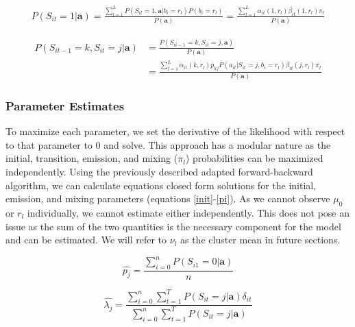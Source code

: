 \documentclass{article}
\begin{document}
\begin{equation}\label{probs1}
\begin{split}
    P(S_{it}=1|\textbf{a}) = 
    \frac{\sum^L_{l=1}P(S_{it}=1,\textbf{a}|b_{i}=r_l)
        P(b_{i}=r_l)}{P(\textbf{a})} = 
    \frac{\sum^L_{l=1}\alpha_{it}(1,r_l)\beta_{it}(1,r_l)\pi_l }{P(\textbf{a})} 
\end{split}
\end{equation}


\begin{equation}\label{probstran}
\begin{split}
    P(S_{it-1}=k,S_{it}=j|\textbf{a}) & = 
        \frac{P(S_{it-1}=k,S_{it}=j,\textbf{a})}{P(\textbf{a})} \\
    & = \frac{\sum^L_{l=1}\alpha_{it}(k,r_l) p_{kj} P(a_{it}|S_{it}=j, b_i=r_l)
        \beta_{it}(j,r_l)\pi_l }{P(\textbf{a})} 
\end{split}
\end{equation}



\subsubsection{Parameter Estimates}

 To maximize each parameter, we set the derivative of the likelihood with respect to that parameter to 0 and solve. This approach has a modular nature as the initial, transition, emission, and mixing ($\pi_l$) probabilities can be maximized independently. Using the previously described adapted forward-backward algorithm, we can calculate equations closed form solutions for the initial, emission, and mixing parameters (equations \ref{init}-\ref{pi}). As we cannot observe $\mu_0$ or $r_l$ individually, we cannot estimate either independently. This does not pose an issue as the sum of the two quantities is the necessary component for the model and can be estimated. We will refer to $\nu_l$ as the cluster mean in future sections. 

\begin{equation}\label{init}
    \hat{p_j}  = \frac{\sum^n_{i=0} P(S_{i1}=0|\textbf{a})}{n}
\end{equation} 

\begin{equation}\label{binom}
    \hat{\lambda_j}  = \frac{\sum^n_{i=0} \sum_{t=1}^T P(S_{it}=j|\textbf{a})\delta_{it}}
                            {\sum^n_{i=0} \sum_{t=1}^TP(S_{it}=j|\textbf{a})}
\end{equation} 
\end{document}

